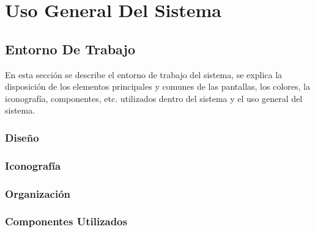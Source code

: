 \documentclass[oneside,10pt,letterpaper]{book}
\begin{document}
\maketitle
\frontmatter
\tableofcontents
\mainmatter
\chapter{Uso General Del Sistema}
\section{Entorno De Trabajo}
En esta sección se describe el entorno de trabajo del sistema, se explica la disposición
de los elementos principales y comunes de las pantallas, los colores, la iconografía, componentes, etc.
utilizados dentro del sistema y el uso general del sistema.

	
\subsection{Diseño}
	

\subsection{Iconografía}
	
\subsection{Organización}
	

\subsection{Componentes Utilizados}
	
	





\end{document}
